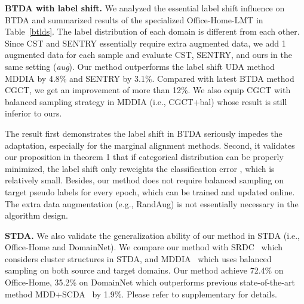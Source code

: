 \documentclass[letterpaper]{article} \usepackage{aaai23}  \usepackage{times}  \usepackage{helvet}  \usepackage{courier}  \usepackage[hyphens]{url}  \usepackage{graphicx} \urlstyle{rm} \def\UrlFont{\rm}  \usepackage{natbib}  \usepackage{caption} \frenchspacing  \setlength{\pdfpagewidth}{8.5in}  \setlength{\pdfpageheight}{11in}
\begin{document}
\noindent\textbf{BTDA with label shift.} We analyzed the essential label shift influence on BTDA and summarized results of the specialized Office-Home-LMT in Table~\ref{btlds}. The label distribution of each domain is different from each other. Since CST and SENTRY essentially require extra augmented data, we add 1 augmented data for each sample and evaluate CST, SENTRY, and ours in the same setting (\textit{aug}). Our method outperforms the label shift UDA method MDDIA by 4.8\% and SENTRY by 3.1\%. Compared with latest BTDA method CGCT, we get an improvement of more than 12\%. We also equip CGCT with balanced sampling strategy in MDDIA (i.e., CGCT+bal) whose result is still inferior to ours.


The result first demonstrates the label shift in BTDA seriously impedes the adaptation, especially for the marginal alignment methods. Second, it validates our proposition in theorem 1 that if categorical distribution  can be properly minimized, the label shift only reweights the classification error , which is relatively small. Besides, our method does not require balanced sampling on target pseudo labels for every epoch, which can be trained and updated online. The extra data augmentation (e.g., RandAug) is not essentially necessary in the algorithm design.


\noindent\textbf{STDA.} We also validate the generalization ability of our method in STDA (i.e., Office-Home and DomainNet). We compare our method with SRDC~\cite{tang2020unsupervised} which considers cluster structures in STDA, and MDDIA~\cite{jiang2020implicit} which uses balanced sampling on both source and target domains. Our method achieve 72.4\% on Office-Home, 35.2\% on DomainNet which outperforms previous state-of-the-art method MDD+SCDA~\cite{li2021semantic} by 1.9\%. Please refer to supplementary for details.
\end{document}
